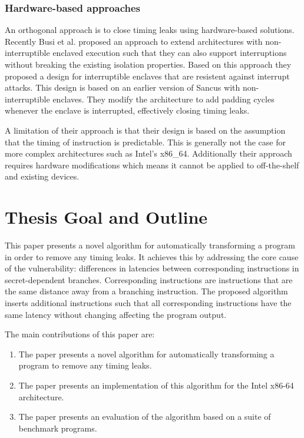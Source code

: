 \subsubsection{Hardware-based approaches}
An orthogonal approach is to close timing leaks using hardware-based solutions. 
Recently Busi et al. \cite{busi} proposed an approach to extend architectures with non-interruptible enclaved execution such that they can also support interruptions without breaking 
the existing isolation properties. Based on this approach they proposed  a design for interruptible enclaves that are resistent against interrupt attacks. 
This design is based on an earlier version of Sancus with non-interruptible enclaves. They modify the architecture to add padding cycles whenever the enclave is interrupted, effectively closing timing leaks. 

A limitation of their approach is that their design is based on the assumption that the timing of instruction is predictable. This is generally not the case for more complex architectures such as Intel's x86\_64.
Additionally their approach requires hardware modifications which means it cannot be applied to off-the-shelf and existing devices. 

	
\section{Thesis Goal and Outline}
This paper presents a novel algorithm for automatically transforming a program in order to remove any timing leaks. It achieves this by addressing the core cause of the vulnerability: differences in 
latencies between corresponding instructions in secret-dependent branches. Corresponding instructions are instructions that are the same distance away from a branching instruction. 
The proposed algorithm inserts additional instructions such that all corresponding instructions have the same latency without changing affecting the program output. 

The main contributions of this paper are:
\begin{enumerate}
\item The paper presents a novel algorithm for automatically transforming a program to remove any timing leaks.
\item The paper presents an implementation of this algorithm for the Intel x86-64 architecture. 
\item The paper presents an evaluation of the algorithm based on a suite of benchmark programs. 
\end{enumerate}

